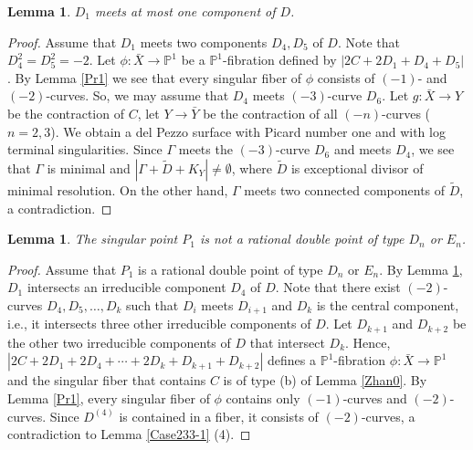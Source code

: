 \documentclass[10pt,oneside,reqno]{amsart}
\newcommand{\pp}{\mathbb{P}}
\newtheorem{lemma}[theorem]{Lemma}
\theoremstyle{definition}
\theoremstyle{remark}
\numberwithin{equation}{section}
\begin{document}
\begin{lemma}
\label{Case233-6}
$D_1$ meets at most one component of $D$.
\end{lemma}

\begin{proof}
Assume that $D_1$ meets two components $D_4, D_5$ of $D$. Note that $D_4^2=D_5^2=-2$. Let $\phi\colon\bar{X}\rightarrow\pp^1$ be a $\pp^1$-fibration defined by $|2C+2D_1+D_4+D_5|$. By Lemma \ref{Pr1} we see that every singular fiber of $\phi$ consists of $(-1)$- and $(-2)$-curves. So, we may assume that $D_4$ meets $(-3)$-curve $D_6$. Let $g\colon\bar{X}\rightarrow Y$ be the contraction of $C$, let $Y\rightarrow\bar{Y}$ be the contraction of all $(-n)$-curves ($n=2,3$). We obtain a del Pezzo surface with Picard number one and with log terminal singularities. Since $\Gamma$ meets the $(-3)$-curve $D_6$ and meets $D_4$, we see that $\Gamma$ is minimal and $|\Gamma+\tilde{D}+K_Y|\neq\emptyset$, where $\tilde{D}$ is exceptional divisor of minimal resolution. On the other hand, $\Gamma$ meets two connected components of $\tilde{D}$, a contradiction.
\end{proof}

\begin{lemma}
\label{Case233-7}
The singular point $P_1$ is not a rational double point of type $D_n$ or $E_n$.
\end{lemma}

\begin{proof}
Assume that $P_1$ is a rational double point of type $D_n$ or $E_n$. By Lemma \ref{Case233-6}, $D_1$ intersects an irreducible component $D_4$ of $D$.
Note that there exist $(-2)$-curves
$D_4,D_5,\ldots, D_k$ such that $D_i$ meets $D_{i+1}$ and $D_k$ is the central component, i.e., it intersects three other irreducible components of $D$. Let $D_{k+1}$ and $D_{k+2}$ be the other two irreducible components of $D$ that intersect $D_k$. Hence, $|2C+2D_1+2D_4+\cdots+2D_k+D_{k+1}+D_{k+2}|$ defines a $\pp^1$-fibration $\phi\colon\bar{X}\rightarrow\pp^1$ and the  singular fiber that contains $C$ is of type (b) of Lemma \ref{Zhan0}. By Lemma \ref{Pr1}, every singular fiber of $\phi$ contains only $(-1)$-curves and $(-2)$-curves. Since $D^{(4)}$ is contained in a fiber, it consists of $(-2)$-curves, a contradiction to Lemma \ref{Case233-1} (4).
\end{proof}
\end{document}
